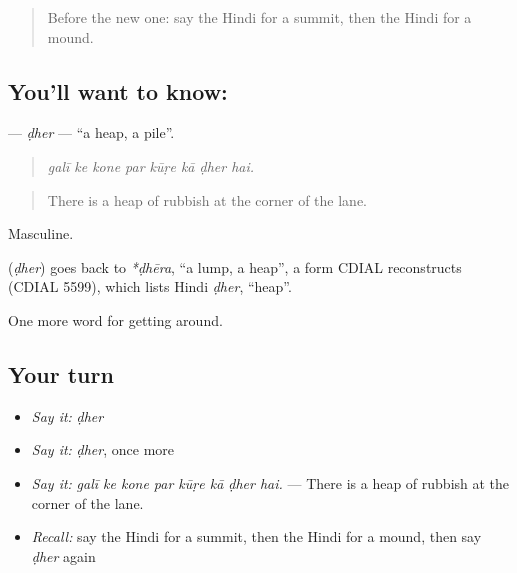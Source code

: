 \label{lesson:HI-C442-dher}



\begin{quote}
Before the new one: say the Hindi for a summit, then the Hindi for a mound.
\end{quote}

\subsection*{You'll want to know: }
\textbf{} — \emph{ḍher} — \textquotedblleft{}a heap, a pile\textquotedblright{}.

\begin{quote}
       
\end{quote}

\begin{quote}
\emph{galī ke kone par kūṛe kā ḍher hai.}
\end{quote}

\begin{quote}
There is a heap of rubbish at the corner of the lane.
\end{quote}

Masculine.

\begin{cousinweb}
\textbf{} (\emph{ḍher}) goes back to \emph{*ḍhēra}, \textquotedblleft{}a lump, a heap\textquotedblright{}, a form CDIAL reconstructs (CDIAL 5599), which lists Hindi \emph{ḍher}, \textquotedblleft{}heap\textquotedblright{}.
\end{cousinweb}

\begin{grammarlens}[title={What you've built}]
One more word for getting around.
\end{grammarlens}

\subsection*{Your turn}
\begin{itemize}
\raggedright
  \item \emph{Say it:} \emph{ḍher}
  \item \emph{Say it:} \emph{ḍher}, once more
  \item \emph{Say it:} \emph{galī ke kone par kūṛe kā ḍher hai.} — There is a heap of rubbish at the corner of the lane.
  \item \emph{Recall:} say the Hindi for a summit, then the Hindi for a mound, then say \emph{ḍher} again
\end{itemize}

